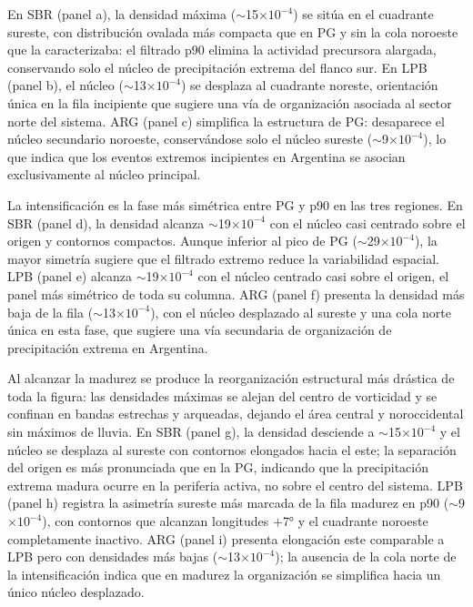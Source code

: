 En SBR (panel a), la densidad máxima ($\sim$15$\times10^{-4}$) se sitúa en el cuadrante sureste, con distribución ovalada más compacta que en PG y sin la cola noroeste que la caracterizaba: el filtrado p90 elimina la actividad precursora alargada, conservando solo el núcleo de precipitación extrema del flanco sur. En LPB (panel b), el núcleo ($\sim$13$\times10^{-4}$) se desplaza al cuadrante noreste, orientación única en la fila incipiente que sugiere una vía de organización asociada al sector norte del sistema. ARG (panel c) simplifica la estructura de PG: desaparece el núcleo secundario noroeste, conservándose solo el núcleo sureste ($\sim$9$\times10^{-4}$), lo que indica que los eventos extremos incipientes en Argentina se asocian exclusivamente al núcleo principal.

La intensificación es la fase más simétrica entre PG y p90 en las tres regiones. En SBR (panel d), la densidad alcanza $\sim$19$\times10^{-4}$ con el núcleo casi centrado sobre el origen y contornos compactos. Aunque inferior al pico de PG ($\sim$29$\times10^{-4}$), la mayor simetría sugiere que el filtrado extremo reduce la variabilidad espacial. LPB (panel e) alcanza $\sim$19$\times10^{-4}$ con el núcleo centrado casi sobre el origen, el panel más simétrico de toda su columna. ARG (panel f) presenta la densidad más baja de la fila ($\sim$13$\times10^{-4}$), con el núcleo desplazado al sureste y una cola norte única en esta fase, que sugiere una vía secundaria de organización de precipitación extrema en Argentina.

Al alcanzar la madurez se produce la reorganización estructural más drástica de toda la figura: las densidades máximas se alejan del centro de vorticidad y se confinan en bandas estrechas y arqueadas, dejando el área central y noroccidental sin máximos de lluvia. En SBR (panel g), la densidad desciende a $\sim$15$\times10^{-4}$ y el núcleo se desplaza al sureste con contornos elongados hacia el este; la separación del origen es más pronunciada que en la PG, indicando que la precipitación extrema madura ocurre en la periferia activa, no sobre el centro del sistema. LPB (panel h) registra la asimetría sureste más marcada de la fila madurez en p90 ($\sim$9$\times10^{-4}$), con contornos que alcanzan longitudes $+$7° y el cuadrante noroeste completamente inactivo. ARG (panel i) presenta elongación este comparable a LPB pero con densidades más bajas ($\sim$13$\times10^{-4}$); la ausencia de la cola norte de la intensificación indica que en madurez la organización se simplifica hacia un único núcleo desplazado.

